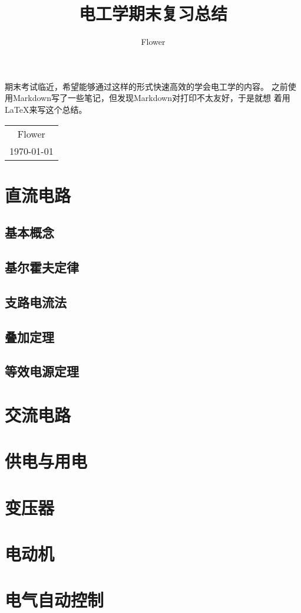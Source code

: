 \documentclass[12pt, a4paper, oneside]{ctexart}%
\date{}
\title{电工学期末复习总结}
\author{Flower}
\begin{document}
\maketitle

期末考试临近，希望能够通过这样的形式快速高效的学会电工学的内容。
之前使用Markdown写了一些笔记，但发现Markdown对打印不太友好，于是就想
着用\LaTeX{}来写这个总结。
~\\
\begin{flushright}
    \begin{tabular}{c}
        Flower\\
        \today
    \end{tabular}
\end{flushright}

\newpage

\tableofcontents
\newpage
\section{直流电路}

\subsection{基本概念}

\subsection{基尔霍夫定律}

\subsection{支路电流法}

\subsection{叠加定理}

\subsection{等效电源定理}

\section{交流电路}

\section{供电与用电}

\section{变压器}

\section{电动机}

\section{电气自动控制}
\end{document}
